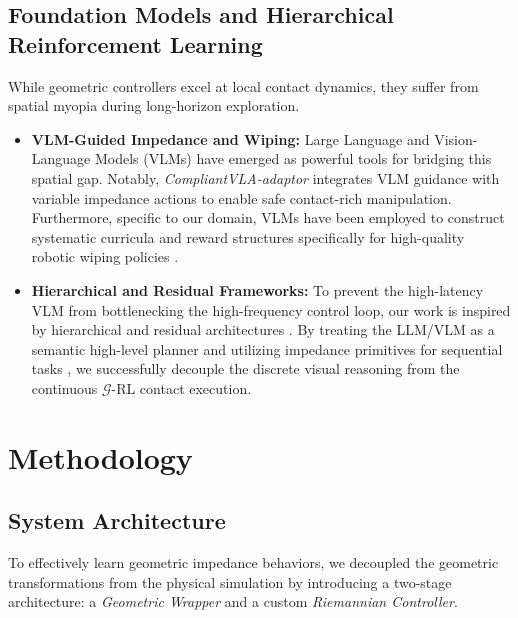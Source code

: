 \documentclass[letterpaper, 10 pt, conference]{IEEEtran}
\begin{document}
\subsection{Foundation Models and Hierarchical Reinforcement Learning}
While geometric controllers excel at local contact dynamics, they suffer from spatial myopia during long-horizon exploration. 
\begin{itemize}
    \item \textbf{VLM-Guided Impedance and Wiping:} Large Language and Vision-Language Models (VLMs) have emerged as powerful tools for bridging this spatial gap. Notably, \textit{CompliantVLA-adaptor} \cite{compliantVLA2024} integrates VLM guidance with variable impedance actions to enable safe contact-rich manipulation. Furthermore, specific to our domain, VLMs have been employed to construct systematic curricula and reward structures specifically for high-quality robotic wiping policies \cite{wipingVLM2023}. 
    \item \textbf{Hierarchical and Residual Frameworks:} To prevent the high-latency VLM from bottlenecking the high-frequency control loop, our work is inspired by hierarchical and residual architectures \cite{residualRL2019, rlingua2024}. By treating the LLM/VLM as a semantic high-level planner \cite{splitdecisions2024, ma2024explorllm, llmtale2024} and utilizing impedance primitives for sequential tasks \cite{tahmaz2025impedance}, we successfully decouple the discrete visual reasoning from the continuous $\mathcal{G}$-RL contact execution.
\end{itemize}



\section{Methodology}
\label{sec:methodology}

\subsection{System Architecture}
To effectively learn geometric impedance behaviors, we decoupled the geometric transformations from the physical simulation by introducing a two-stage architecture: a \textit{Geometric Wrapper} and a custom \textit{Riemannian Controller}.
\end{document}
